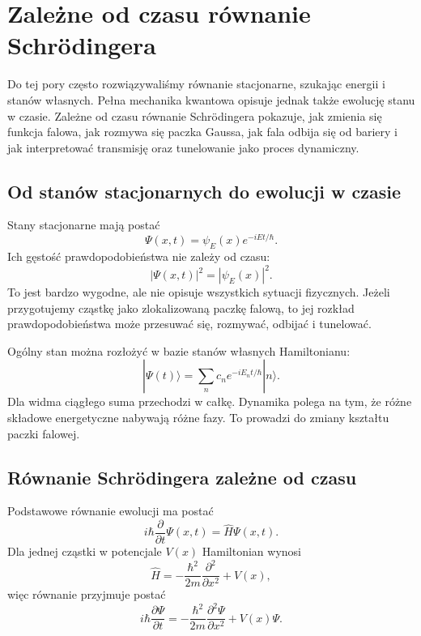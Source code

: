 \chapter{Zależne od czasu równanie Schrödingera}

\begin{summarybox}
Do tej pory często rozwiązywaliśmy równanie stacjonarne, szukając energii i
stanów własnych. Pełna mechanika kwantowa opisuje jednak także ewolucję stanu w
czasie. Zależne od czasu równanie Schrödingera pokazuje, jak zmienia się funkcja
falowa, jak rozmywa się paczka Gaussa, jak fala odbija się od bariery i jak
interpretować transmisję oraz tunelowanie jako proces dynamiczny.
\end{summarybox}

\section{Od stanów stacjonarnych do ewolucji w czasie}

Stany stacjonarne mają postać
\begin{equation}
    \Psi(x,t)=\psi_E(x)e^{-iEt/\hbar}.
\end{equation}
Ich gęstość prawdopodobieństwa nie zależy od czasu:
\begin{equation}
    |\Psi(x,t)|^2=|\psi_E(x)|^2.
\end{equation}
To jest bardzo wygodne, ale nie opisuje wszystkich sytuacji fizycznych. Jeżeli przygotujemy cząstkę jako zlokalizowaną paczkę falową, to jej rozkład prawdopodobieństwa może przesuwać się, rozmywać, odbijać i tunelować.

Ogólny stan można rozłożyć w bazie stanów własnych Hamiltonianu:
\begin{equation}
    |\Psi(t)\rangle=\sum_n c_n e^{-iE_n t/\hbar}|n\rangle.
\end{equation}
Dla widma ciągłego suma przechodzi w całkę. Dynamika polega na tym, że różne składowe energetyczne nabywają różne fazy. To prowadzi do zmiany kształtu paczki falowej.

\section{Równanie Schrödingera zależne od czasu}

Podstawowe równanie ewolucji ma postać
\begin{equation}
    i\hbar\frac{\partial}{\partial t}\Psi(x,t)=\hat{H}\Psi(x,t).
\end{equation}
Dla jednej cząstki w potencjale \(V(x)\) Hamiltonian wynosi
\begin{equation}
    \hat{H}=-\frac{\hbar^2}{2m}\frac{\partial^2}{\partial x^2}+V(x),
\end{equation}
więc równanie przyjmuje postać
\begin{equation}
    i\hbar\frac{\partial\Psi}{\partial t}
    =-\frac{\hbar^2}{2m}\frac{\partial^2\Psi}{\partial x^2}+V(x)\Psi.
\end{equation}

